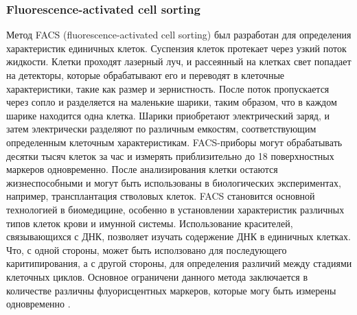 \subsubsection{Fluorescence-activated cell sorting}
Метод FACS (fluorescence-activated cell sorting) был разработан для определения характеристик единичных клеток. Суспензия клеток протекает через узкий поток жидкости. Клетки
проходят лазерный луч, и рассеянный на клетках свет попадает на детекторы, которые обрабатывают его и переводят в клеточные характеристики, такие как размер и зернистность.
После поток пропускается через сопло и разделяется на маленькие шарики, таким образом,
что в каждом шарике находится одна клетка. Шарики приобретают электрический заряд,
и затем электрически разделяют по различным емкостям, соответствующим определенным
клеточным характеристикам. FACS-приборы могут обрабатывать десятки тысяч клеток за
час и измерять приблизительно до 18 поверхностных маркеров одновременно. После анализирования клетки остаются жизнеспособными и могут быть использованы в биологических
экспериментах, например, трансплантация стволовых клеток. FACS становится основной технологией в биомедицине, особенно в установлении характеристик различных типов клеток
крови и имунной системы. Использование красителей, связывающихся с ДНК, позволяет
изучать содержение ДНК в единичных клетках. Что, с одной стороны, может быть исползовано для последующего каритипирования, а с другой стороны, для определения различий
между стадиями клеточных циклов. Основное ограничени данного метода заключается в
количестве различны флуорисцентных маркеров, которые могу быть измерены одновременно \cite{Kalisky2014}.

